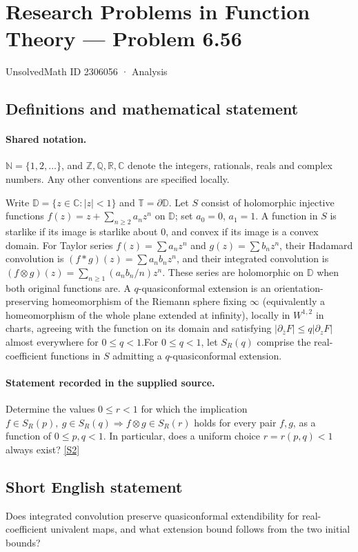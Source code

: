 \documentclass[11pt]{article}
\newcommand{\sref}[2]{\hyperlink{source:#1:#2}{[S#2]}}
\begin{document}
\setcounter{section}{2306055}
\section{Research Problems in Function Theory — Problem 6.56}\label{2306056}
{\small\sffamily UnsolvedMath ID 2306056 · Analysis}
\subsection{Definitions and mathematical statement}

\paragraph{Shared notation.}$\mathbb N=\{1,2,\ldots\}$, and $\mathbb Z,\mathbb Q,\mathbb R,\mathbb C$ denote the integers, rationals, reals and complex numbers. Any other conventions are specified locally.


Write $\mathbb D=\{z\in\mathbb C:|z|<1\}$ and $\mathbb T=\partial\mathbb D$. Let $S$ consist of holomorphic injective functions $f(z)=z+\sum_{n\ge2}a_nz^n$ on $\mathbb D$; set $a_0=0$, $a_1=1$. A function in $S$ is starlike if its image is starlike about $0$, and convex if its image is a convex domain. For Taylor series $f(z)=\sum a_nz^n$ and $g(z)=\sum b_nz^n$, their Hadamard convolution is $(f*g)(z)=\sum a_nb_nz^n$, and their integrated convolution is $(f\otimes g)(z)=\sum_{n\ge1}(a_nb_n/n)z^n$. These series are holomorphic on $\mathbb D$ when both original functions are. A $q$-quasiconformal extension is an orientation-preserving homeomorphism of the Riemann sphere fixing $\infty$ (equivalently a homeomorphism of the whole plane extended at infinity), locally in $W^{1,2}$ in charts, agreeing with the function on its domain and satisfying $|\partial_{\bar z}F|\le q|\partial_zF|$ almost everywhere for $0\le q<1$.For $0\le q<1$, let $S_R(q)$ comprise the real-coefficient functions in $S$ admitting a $q$-quasiconformal extension.
\paragraph{Statement recorded in the supplied source.}
Determine the values $0\le r<1$ for which the implication $f\in S_R(p),\ g\in S_R(q)\Longrightarrow f\otimes g\in S_R(r)$ holds for every pair $f,g$, as a function of $0\le p,q<1$. In particular, does a uniform choice $r=r(p,q)<1$ always exist? \sref{2306056}{2}
\subsection{Short English statement}
Does integrated convolution preserve quasiconformal extendibility for real-coefficient univalent maps, and what extension bound follows from the two initial bounds?
\end{document}
